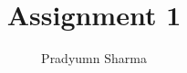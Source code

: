 \documentclass[journal,12pt,twocolumn]{IEEEtran}
\begin{document}
\makeatletter
{}
\makeatother
\let\StandardTheFigure\thefigure
\let\vec\mathbf
\renewcommand{\thefigure}{\theproblem}
\def\putbox#1#2#3{\makebox[0in][l]{\makebox[#1][l]{}\raisebox{\baselineskip}[0in][0in]{\raisebox{#2}[0in][0in]{#3}}}}
     \def\rightbox#1{\makebox[0in][r]{#1}}
     \def\centbox#1{\makebox[0in]{#1}}
     \def\topbox#1{\raisebox{-\baselineskip}[0in][0in]{#1}}
     \def\midbox#1{\raisebox{-0.5\baselineskip}[0in][0in]{#1}}
\vspace{3cm}
\title{Assignment 1}
\author{Pradyumn Sharma}
%
%
%
% 
%
\end{document}
